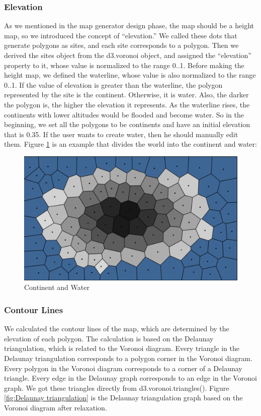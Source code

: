\subsubsection{Elevation}
As we mentioned in the map generator design phase, the map should be a height map, so we introduced the concept of ``elevation.'' We called these dots that generate polygons as sites, and each site corresponds to a polygon. Then we derived the sites object from the d3.voronoi object, and assigned the ``elevation'' property to it, whose value is normalized to the range 0..1. Before making the height map, we defined the waterline, whose value is also normalized to the range 0..1. If the value of elevation is greater than the waterline, the polygon represented by the site is the continent. Otherwise, it is water. Also, the darker the polygon is, the higher the elevation it represents. As the waterline rises, the continents with lower altitudes would be flooded and become water. So in the beginning, we set all the polygons to be continents and have an initial elevation that is 0.35. If the user wants to create water, then he should manually edit them. Figure \ref{fig:Height Map} is an example that divides the world into the continent and water:

\begin{figure}[htbp]
  \includegraphics[width=\textwidth]{section04/assets/Map-heightmap.png}
  \caption{Continent and Water}
  \label{fig:Height Map}
\end{figure}

\subsubsection{Contour Lines}
We calculated the contour lines of the map, which are determined by the elevation of each polygon. The calculation is based on the Delaunay triangulation, which is related to the Voronoi diagram. Every triangle in the Delaunay triangulation corresponds to a polygon corner in the Voronoi diagram. Every polygon in the Voronoi diagram corresponds to a corner of a Delaunay triangle. Every edge in the Delaunay graph corresponds to an edge in the Voronoi graph. We got these triangles directly from d3.voronoi.triangles(). Figure \ref{fig:Delaunay triangulation} is the Delaunay triangulation graph based on the Voronoi diagram after relaxation.

